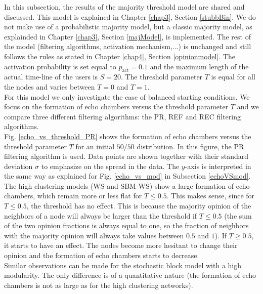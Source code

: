 \documentclass[11 pt , letterpaper , twoside , openright]{book}
\begin{document}
In this subsection, the results of the majority threshold model are shared and discussed. This model is explained in Chapter \ref{chap3}, Section \ref{stubbBin}. We do not make use of a probabilistic majority model, but a classic majority model, as explainded in Chapter \ref{chap3}, Section \ref{majModel}, is implemented. The rest of the model (filtering algorithms, activation mechanism,...) is unchanged and still follows the rules as stated in Chapter \ref{chap4}, Section \ref{opinionmodel}. The activation probability is set equal to $p_{\text{act}} = 0.1$ and the maximum length of the actual time-line of the users is $S=20$. The threshold parameter $T$ is equal for all the nodes and varies between $T=0$ and $T=1$.\\
\newline
For this model we only investigate the case of balanced starting conditions. We focus on the formation of echo chambers versus the threshold parameter $T$ and we compare three different filtering algorithms: the PR, REF and REC filtering algorithms. \\
\newline
Fig. \ref{echo_vs_threshold_PR} shows the formation of echo chambers versus the threshold parameter $T$ for an initial $50/50$ distribution. In this figure, the PR filtering algorithm is used. Data points are shown together with their standard deviation $\sigma$ to emphasize on the spread in the data. The $y$-axis is interpreted in the same way as explained for Fig. \ref{echo_vs_mod} in Subsection \ref{echoVSmod}.\\
\newline
The high clustering models (WS and SBM-WS) show a large formation of echo chambers, which remain more or less flat for $T \leqslant 0.5$. This makes sense, since for $T \leqslant 0.5$, the threshold has no effect. This is because the majority opinion of the neighbors of a node will always be larger than the threshold if $T \leqslant 0.5$ (the sum of the two opinion fractions is always equal to one, so the fraction of neighbors with the majority opinion will always take values between $0.5$ and $1$). If $T \geqslant 0.5$, it starts to have an effect. The nodes become more hesitant to change their opinion and the formation of echo chambers starts to decrease.\\
\newline
Similar observations can be made for the stochastic block model with a high modularity. The only difference is of a quantitative nature (the formation of echo chambers is not as large as for the high clustering networks).\\
\end{document}
